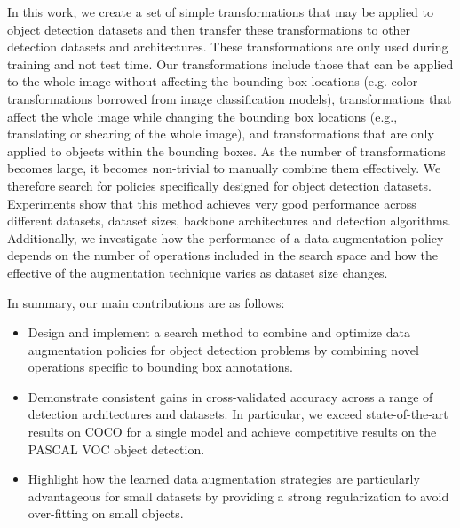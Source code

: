 \documentclass[10pt,twocolumn,letterpaper]{article}
\begin{document}
In this work, we create a set of simple transformations that may be applied to object detection datasets and then transfer these transformations to other detection datasets and architectures. These transformations are only used during training and not test time. Our transformations include those that can be applied to the whole image without affecting the bounding box locations (e.g. color transformations borrowed from image classification models), transformations that affect the whole image while changing the bounding box locations (e.g., translating or shearing of the whole image), and transformations that are only applied to objects within the bounding boxes. As the number of transformations becomes large, it becomes non-trivial to manually combine them effectively. We therefore search for policies specifically designed for object detection datasets. Experiments show that this method achieves very good performance across different datasets, dataset sizes, backbone architectures and detection algorithms. Additionally, we investigate how the performance of a data augmentation policy depends on the number of operations included in the search space
and how the effective of the augmentation technique varies as dataset size changes. 

In summary, our main contributions are as follows:
\begin{itemize}
\item Design and implement a search method to combine and optimize data augmentation policies for object detection problems by combining novel operations specific to bounding box annotations.
\item Demonstrate consistent gains in cross-validated accuracy across a range of detection architectures and datasets.  In particular, we exceed state-of-the-art results on COCO for a single model and achieve competitive results on the PASCAL VOC object detection.
\item Highlight how the learned data augmentation strategies are particularly advantageous for small datasets by providing a strong regularization to avoid over-fitting on small objects.
\end{itemize}
\end{document}
